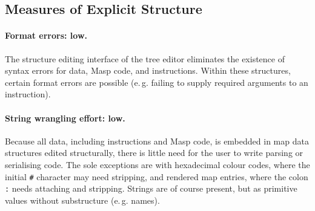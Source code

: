 \documentclass[ twoside,openright,titlepage,numbers=noenddot,headinclude,footinclude,cleardoublepage=empty,abstract=on,
                BCOR=5mm,paper=a4,fontsize=11pt
                ]{scrreprt}
\newcommand{\eg}{e.\,g.}
\newcommand{\joel}[1]{}
\newcommand{\criterion}{\paragraph}
\theoremstyle{definition}
\begin{document}
\joel{
\criterion{Are there multiple syntaxes for textual notation? No.} Only JavaScript syntax is available in the special `js` instruction. However, the system is built on explicit structure, so syntax does not make much of an appearance at all.

\criterion{Does the system make use of GUI elements? Yes.}
BootstrapLab's graphics window is a zoomable/draggable view containing a crude tree editor. Next to it is a rendering of the state tree in ordinary web HTML elements.

\criterion{Is it possible to view and edit data as tree structures? Yes.}
Tree-structured data can be viewed in the HTML-rendered tree view and the in-system tree editor. It can be edited only in the latter.

\criterion{Does the system allow freeform arrangement and sizing of data items? No.}
We did not have enough time to support the moving and resizing of items in the graphics window.

\criterion{Is there support for custom user-supplied notations? Potentially.}
The code for rendering the tree editor and accepting user input currently lives in the substrate. However, we gave a proof-of-concept in\ Section\ref{provide-for-domain-specific-notations} for how this could be moved in-system. Because of this, there is no inherent barrier to custom notations.

\criterion{Is there support for custom user-supplied grammars? Potentially.} Ditto.
}

\hypertarget{measures-of-explicit-structure}{\subsection{Measures of Explicit
Structure}\label{measures-of-explicit-structure}}

\criterion{Format errors: low.} The structure editing interface of the
tree editor eliminates the existence of syntax errors for data, Masp
code, and instructions. Within these structures, certain format errors
are possible (\eg{} failing to supply required arguments to an
instruction).

\criterion{String wrangling effort: low.} Because all data, including
instructions and Masp code, is embedded in map data structures edited
structurally, there is little need for the user to write parsing or
serialising code. The sole exceptions are with hexadecimal colour codes,
where the initial \texttt{\#} character may need stripping, and rendered
map entries, where the colon \texttt{:} needs attaching and stripping.
Strings are of course present, but as primitive values without
substructure (\eg{} names).
\end{document}
